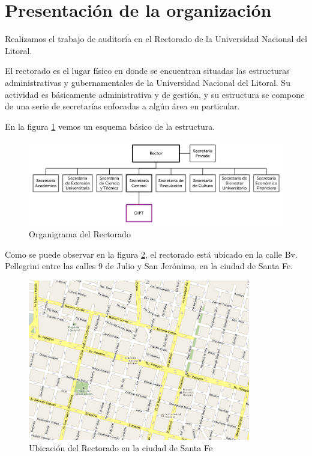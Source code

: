 \documentclass[a4paper,11pt,oneside]{article}
\begin{document}
\maketitle
%
%
\section{Presentación de la organización}
%
Realizamos el trabajo de auditoría en el Rectorado de la Universidad
Nacional del Litoral.

El rectorado es el lugar físico en donde se encuentran situadas las
estructuras administrativas y gubernamentales de la Universidad
Nacional del Litoral.  Su actividad es básicamente administrativa y de
gestión, y su estructura se compone de una serie de secretarías
enfocadas a algún área en particular.

En la figura \ref{organi-rectorado} vemos un esquema básico de la estructura.
%
\begin{figure}[H]
  \center\includegraphics[width=\textwidth]{img/organi_rectorado}
  \caption{Organigrama del Rectorado}
  \label{organi-rectorado}
\end{figure}

Como se puede observar en la figura \ref{mapa-ubicación}, el rectorado está ubicado en la calle Bv. Pellegrini entre las calles 9 de Julio y San Jerónimo, en la ciudad de Santa Fe.

\begin{figure}
  \center\includegraphics[height=7cm]{img/mapa.png}
  \caption{Ubicación del Rectorado en la ciudad de Santa Fe}
  \label{mapa-ubicación}
\end{figure}
\end{document}
